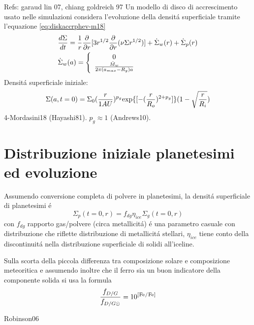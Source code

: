 \begin{workout}
Refs: garaud lin 07, chiang goldreich 97
Un modello di disco  di accrescimento usato nelle simulazioni considera l'evoluzione della densit\'a superficiale tramite l'equazione \eqref{eq:diskaccrphev-m18}
\begin{align}
&\frac{d \Sigma}{d t}=\frac{1}{r}\frac{\partial}{\partial r}[3r^{1/2}\frac{\partial}{\partial r}(\nu\Sigma r^{1/2})]+\dot{\Sigma}_w(r)+\dot{\Sigma}_p(r)\label{eq:diskaccrphev-m18}\\
&\dot{\Sigma}_w(a)=\left\{\begin{array}{c}0\\\frac{\dot{M}_w}{2\pi(a_{max}-R_g)a}\\\end{array}\right.
\end{align}
Densit\'a superficiale iniziale:
\begin{equation}
\Sigma(a,t=0)=\Sigma_0(\frac{r}{1AU})^{p_g}\text{exp}\{[-(\frac{r}{R_o})^{2+p_g}]\}(1-\sqrt{\frac{r}{R_i}})
\end{equation}
4-Mordasini18 (Hayashi81). $p_g\approx1$ (Andrews10).
\end{workout}

\section{Distribuzione iniziale planetesimi ed evoluzione}

Assumendo conversione completa di polvere in planetesimi, la densit\'a superficiale di planetesimi \'e
\begin{equation}
\Sigma_p(t=0,r)=f_{dg}\eta_{ice}\Sigma_g(t=0,r)
\end{equation}
con $f_{dg}$ rapporto gas/polvere (circa metallicit\'a) \'e una parametro casuale con distribuzione che riflette distribuzione di metallicit\'a stellari, $\eta_{ice}$ tiene conto della discontinuit\'a nella distribuzione superficiale di solidi all'iceline.

Sulla scorta della piccola differenza tra composizione solare e composizione meteoritica e assumendo inoltre che il ferro sia un buon indicatore della componente solida  si usa la formula
\begin{equation}
\frac{f_{D/G}}{f_{D/G\odot}}=10\expy{[\cel{Fe}{}{}{}/\cel{Fe}{}{}{}]}
\end{equation}

\begin{workout}
Robinson06
\end{workout}

